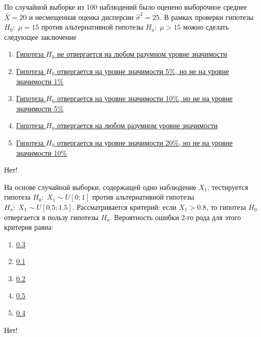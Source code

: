 \documentclass[t]{beamer}
\begin{document}
 \begin{frame} \label{43-No} 
\begin{block}{43} 

По случайной выборке из 100 наблюдений было оценено выборочное среднее $\bar{X}=20$  и несмещенная оценка дисперсии  $\hat{\sigma}^2=25$. В рамках проверки гипотезы $H_0: \; \mu=15$  против альтернативной гипотезы $H_a: \; \mu>15$  можно сделать следующее заключение
 


 \end{block} 
\begin{enumerate} 
\item[] \hyperlink{43-No}{\beamergotobutton{} Гипотеза $H_0$  не отвергается на любом разумном уровне значимости}
\item[] \hyperlink{43-No}{\beamergotobutton{} Гипотеза $H_0$  отвергается на уровне значимости 5\%, но не  на уровне значимости 1\%}
\item[] \hyperlink{43-No}{\beamergotobutton{} Гипотеза  $H_0$ отвергается на уровне значимости 10\%, но не на уровне значимости 5\%}
\item[] \hyperlink{43-Yes}{\beamergotobutton{} Гипотеза $H_0$  отвергается на любом разумном уровне значимости}
\item[] \hyperlink{43-No}{\beamergotobutton{} Гипотеза  $H_0$ отвергается на уровне значимости 20\%, но не  на уровне значимости 10\%}
\end{enumerate} 

 \alert{Нет!} 
\end{frame} 


 \begin{frame} \label{44-No} 
\begin{block}{44} 

На основе случайной выборки, содержащей одно наблюдение  $X_1$, тестируется гипотеза $H_0: \; X_1 \sim U[0;1]$  против альтернативной гипотезы  $H_a: \; X_1 \sim U[0.5;1.5]$. Рассматривается критерий: если $X_1>0.8$, то гипотеза $H_0$  отвергается в пользу гипотезы  $H_a$. Вероятность ошибки 2-го рода для этого критерия равна:
 


 \end{block} 
\begin{enumerate} 
\item[] \hyperlink{44-Yes}{\beamergotobutton{} 0.3}
\item[] \hyperlink{44-No}{\beamergotobutton{} 0.1}
\item[] \hyperlink{44-No}{\beamergotobutton{} 0.2}
\item[] \hyperlink{44-No}{\beamergotobutton{} 0.5}
\item[] \hyperlink{44-No}{\beamergotobutton{} 0.4}
\end{enumerate} 

 \alert{Нет!} 
\end{frame} 
\end{document}
